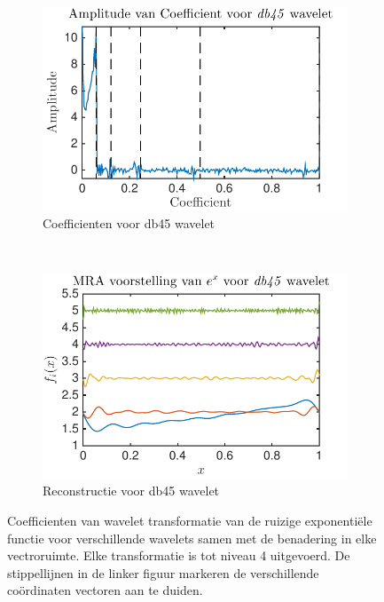 \begin{figure}
\begin{subfigure}[b]{0.4\textwidth}
        \includegraphics[width=\textwidth]{../src/denoising/db45_Noise/coef_exp_db45_4_noise_10}
        \caption{Coefficienten voor db45 wavelet}
        \label{fig:tiger}
    \end{subfigure}
    ~ %
    \begin{subfigure}[b]{0.4\textwidth}
        \includegraphics[width=\textwidth]{../src/denoising/db45_Noise/MRA_exp_db45_4_noise_10}
        \caption{Reconstructie voor db45 wavelet}
        \label{fig:mouse}
    \end{subfigure}
    \caption{Coefficienten van wavelet transformatie van de ruizige exponenti\"ele functie voor verschillende wavelets samen met de benadering in elke vectroruimte. Elke transformatie is tot niveau 4 uitgevoerd. De stippellijnen in de linker figuur markeren de verschillende co\"ordinaten vectoren aan te duiden.}\label{fig:exp_Noise_noise_10}
\end{figure}





